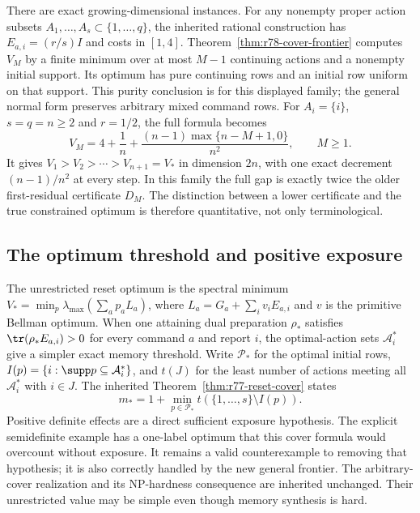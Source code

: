 There are exact growing-dimensional instances.  For any nonempty proper
action subsets $A_1,\ldots,A_s\subset\{1,\ldots,q\}$, the inherited
rational construction has $E_{a,i}=(r/s)I$ and costs in $[1,4]$.
Theorem~\ref{thm:r78-cover-frontier} computes $V_M$ by a finite minimum
over at most $M-1$ continuing actions and a nonempty initial support.
Its optimum has pure continuing rows and an initial row uniform on
that support.  This purity conclusion is for this displayed family;
the general normal form preserves arbitrary mixed command rows.
For $A_i=\{i\}$, $s=q=n\ge2$ and $r=1/2$, the full formula becomes
\begin{equation}\label{eq:r78-intro-hierarchy}
 V_M=4+\frac1n+
      \frac{(n-1)\max\{n-M+1,0\}}{n^2},\qquad M\ge1.
\end{equation}
It gives $V_1>V_2>\cdots>V_{n+1}=V_*$ in dimension $2n$, with
one exact decrement $(n-1)/n^2$ at every step.  In this family the full
gap is exactly twice the older first-residual certificate $D_M$.
The distinction between a lower certificate and the true constrained
optimum is therefore quantitative, not only terminological.

\subsection*{The optimum threshold and positive exposure}

The unrestricted reset optimum is the spectral minimum
$V_*=\min_p\lambda_{\max}(\sum_a p_aL_a)$, where
$L_a=G_a+\sum_i v_iE_{a,i}$ and $v$ is the primitive Bellman optimum.
When one attaining dual preparation $\rho_*$ satisfies
$\tr(\rho_*E_{a,i})>0$ for every command $a$ and report $i$,
the optimal-action sets $\mathcal A_i^*$ give a simpler exact memory
threshold.  Write $\mathcal P_*$ for the optimal initial rows,
$I(p)=\{i:\supp p\subseteq\mathcal A_i^*\}$, and $t(J)$ for the
least number of actions meeting all $\mathcal A_i^*$ with $i\in J$.
The inherited Theorem~\ref{thm:r77-reset-cover} states
\begin{equation}\label{eq:r77-intro-reset}
 m_*=1+\min_{p\in\mathcal P_*}
                 t(\{1,\ldots,s\}\setminus I(p)).
\end{equation}
Positive definite effects are a direct sufficient exposure hypothesis.
The explicit semidefinite example has a one-label optimum that this
cover formula would overcount without exposure.  It remains a valid
counterexample to removing that hypothesis; it is also correctly
handled by the new general frontier.  The arbitrary-cover realization
and its NP-hardness consequence are inherited unchanged.  Their
unrestricted value may be simple even though memory synthesis is hard.

